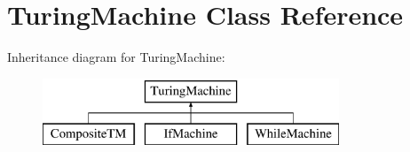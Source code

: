 \hypertarget{class_turing_machine}{}\section{Turing\+Machine Class Reference}
\label{class_turing_machine}
Inheritance diagram for Turing\+Machine\+:\begin{figure}[H]
\begin{center}
\leavevmode
\includegraphics[height=2.000000cm]{class_turing_machine}
\end{center}
\end{figure}
